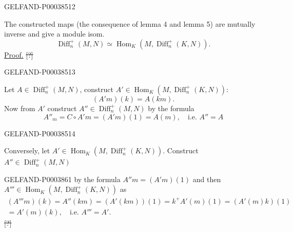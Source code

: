 \begin{GelfandAdjacentEvidence}{GELFAND-P000385}{12}

The constructed maps (the consequence of lemma 4 and lemma 5) are mutually inverse and
give a module isom.
\begin{equation*}
\operatorname{Diff}_n^+(M, N)\simeq
\operatorname{Hom}_K (M,\operatorname{Diff}_n^+(K, N)).
\end{equation*}
\underline{Proof.} \sout{[?]}
\end{GelfandAdjacentEvidence}
\begin{GelfandAdjacentEvidence}{GELFAND-P000385}{13}

Let $A\in\operatorname{Diff}_n^+(M, N)$, construct
$A'\in\operatorname{Hom}_K (M,\operatorname{Diff}_n^+(K, N))$:
\begin{equation*}(A'm)(k)=A (km).\end{equation*}
Now from $A'$ construct $A''\in\operatorname{Diff}_n^+(M, N)$ by the formula
\begin{equation*}
A''_m=C\circ A'm=(A'm)(1)=A (m),\quad\text{i.e. }A''=A
\end{equation*}
\end{GelfandAdjacentEvidence}
\begin{GelfandAdjacentEvidence}{GELFAND-P000385}{14}

Conversely, let $A'\in\operatorname{Hom}_K (M,\operatorname{Diff}_n^+(K, N))$.
Construct $A''\in\operatorname{Diff}_n^+(M, N)$
\end{GelfandAdjacentEvidence}



\begin{GelfandAdjacentEvidence}{GELFAND-P000386}{1}
by the formula $A''m=(A'm)(1)$ and then
$A'''\in\operatorname{Hom}_K (M,\operatorname{Diff}_n^+(K, N))$
as
\begin{multline*}
(A'''m)(k)=A''(km)=(A'(km))(1)=k^+A'(m)(1)=(A'(m)k)(1)\\
=A'(m)(k),\quad\text{i.e. }A'''=A'.
\end{multline*}
\sout{[?]}
\end{GelfandAdjacentEvidence}

